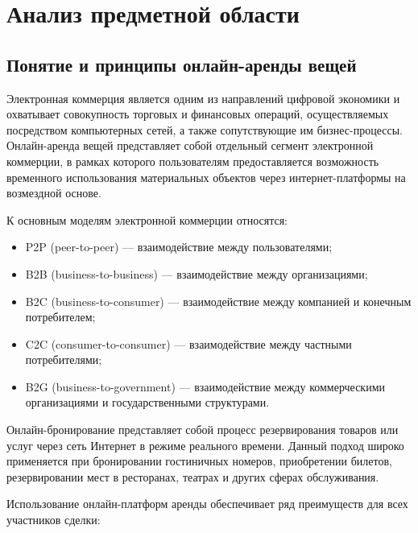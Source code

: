 \section{Анализ предметной области}

\subsection{Понятие и принципы онлайн-аренды вещей}

Электронная коммерция является одним из направлений цифровой экономики и охватывает совокупность торговых и финансовых операций, осуществляемых посредством компьютерных сетей, а также сопутствующие им бизнес-процессы. Онлайн-аренда вещей представляет собой отдельный сегмент электронной коммерции, в рамках которого пользователям предоставляется возможность временного использования материальных объектов через интернет-платформы на возмездной основе.

К основным моделям электронной коммерции относятся:

\begin{itemize}
\item P2P (peer-to-peer) --- взаимодействие между пользователями;
\item B2B (business-to-business) --- взаимодействие между организациями;
\item B2C (business-to-consumer) --- взаимодействие между компанией и конечным потребителем;
\item C2C (consumer-to-consumer) --- взаимодействие между частными потребителями;
\item B2G (business-to-government) --- взаимодействие между коммерческими организациями и государственными структурами.
\end{itemize}

Онлайн-бронирование представляет собой процесс резервирования товаров или услуг через сеть Интернет в режиме реального времени. Данный подход широко применяется при бронировании гостиничных номеров, приобретении билетов, резервировании мест в ресторанах, театрах и других сферах обслуживания.

Использование онлайн-платформ аренды обеспечивает ряд преимуществ для всех участников сделки:

